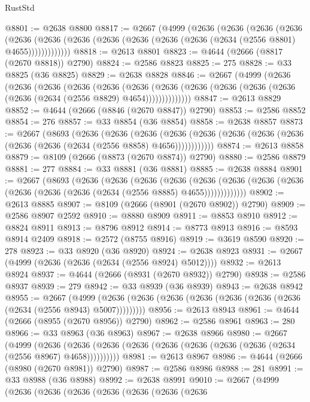 \begin{lexlean}{RustStd}
\begin{coremodule}
@8801 := @2638 @8800
@8817 := @2667
    (@4999
      (@2636
        (@2636
          (@2636
            (@2636
              (@2636
                (@2636 (@2636 (@2636 (@2636 (@2636 (@2636 (@2634 (@2556 @8801) @4655)))))))))))))
@8818 := @2613 @8801
@8823 := @4644 (@2666 (@8817 (@2670 @8818)) @2790)
@8824 := @2586 @8823
@8825 := 275
@8828 := @33 @8825 (@36 @8825)
@8829 := @2638 @8828
@8846 := @2667
    (@4999
      (@2636
        (@2636
          (@2636
            (@2636
              (@2636
                (@2636
                  (@2636 (@2636 (@2636 (@2636 (@2636 (@2636 (@2634 (@2556 @8829) @4654))))))))))))))
@8847 := @2613 @8829
@8852 := @4644 (@2666 (@8846 (@2670 @8847)) @2790)
@8853 := @2586 @8852
@8854 := 276
@8857 := @33 @8854 (@36 @8854)
@8858 := @2638 @8857
@8873 := @2667
    (@8693
      (@2636
        (@2636
          (@2636
            (@2636 (@2636 (@2636 (@2636 (@2636 (@2636 (@2636 (@2634 (@2556 @8858) @4656))))))))))))
@8874 := @2613 @8858
@8879 := @8109 (@2666 (@8873 (@2670 @8874)) @2790)
@8880 := @2586 @8879
@8881 := 277
@8884 := @33 @8881 (@36 @8881)
@8885 := @2638 @8884
@8901 := @2667
    (@8693
      (@2636
        (@2636
          (@2636
            (@2636
              (@2636
                (@2636 (@2636 (@2636 (@2636 (@2636 (@2636 (@2634 (@2556 @8885) @4655)))))))))))))
@8902 := @2613 @8885
@8907 := @8109 (@2666 (@8901 (@2670 @8902)) @2790)
@8909 := @2586 @8907 @2592
@8910 := @8880 @8909
@8911 := @8853 @8910
@8912 := @8824 @8911
@8913 := @8796 @8912
@8914 := @8773 @8913
@8916 := @8593 @8914 @2409
@8918 := @2572 (@8755 @8916)
@8919 := @3619 @8590
@8920 := 278
@8923 := @33 @8920 (@36 @8920)
@8924 := @2638 @8923
@8931 := @2667 (@4999 (@2636 (@2636 (@2634 (@2556 @8924) @5012))))
@8932 := @2613 @8924
@8937 := @4644 (@2666 (@8931 (@2670 @8932)) @2790)
@8938 := @2586 @8937
@8939 := 279
@8942 := @33 @8939 (@36 @8939)
@8943 := @2638 @8942
@8955 := @2667
    (@4999 (@2636 (@2636 (@2636 (@2636 (@2636 (@2636 (@2636 (@2634 (@2556 @8943) @5007)))))))))
@8956 := @2613 @8943
@8961 := @4644 (@2666 (@8955 (@2670 @8956)) @2790)
@8962 := @2586 @8961
@8963 := 280
@8966 := @33 @8963 (@36 @8963)
@8967 := @2638 @8966
@8980 := @2667
    (@4999
      (@2636 (@2636 (@2636 (@2636 (@2636 (@2636 (@2636 (@2636 (@2634 (@2556 @8967) @4658))))))))))
@8981 := @2613 @8967
@8986 := @4644 (@2666 (@8980 (@2670 @8981)) @2790)
@8987 := @2586 @8986
@8988 := 281
@8991 := @33 @8988 (@36 @8988)
@8992 := @2638 @8991
@9010 := @2667
    (@4999
      (@2636
        (@2636
          (@2636
            (@2636
              (@2636
                (@2636
                  (@2636

\end{coremodule}
\end{lexlean}
